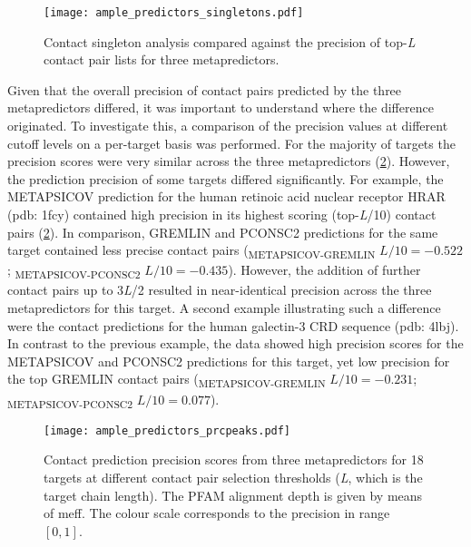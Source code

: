 \begin{figure}[H]
    \centering
    \texttt{[image: ample\_predictors\_singletons.pdf]}
    \caption[Contact singleton analysis for three metapredictors]{Contact singleton analysis compared against the precision of top-\textit{L} contact pair lists for three metapredictors.}
    \label{fig:ample_predictors_singletons}
\end{figure}

Given that the overall precision of contact pairs predicted by the three metapredictors differed, it was important to understand where the difference originated. To investigate this, a comparison of the precision values at different cutoff levels on a per-target basis was performed. For the majority of targets the precision scores were very similar across the three metapredictors (\cref{fig:ample_predictors_prcpeaks}). However, the prediction precision of some targets differed significantly. For example, the METAPSICOV prediction for the human retinoic acid nuclear receptor HRAR (\gls{pdb}: 1fcy) contained high precision in its highest scoring (top-\textit{L}/10) contact pairs (\cref{fig:ample_predictors_prcpeaks}). In comparison, GREMLIN and PCONSC2 predictions for the same target contained less precise contact pairs (\textDelta \textsubscript{METAPSICOV-GREMLIN} $L/10=-0.522$; \textDelta \textsubscript{METAPSICOV-PCONSC2} $L/10=-0.435$). However, the addition of further contact pairs up to 3\textit{L}/2 resulted in near-identical precision across the three metapredictors for this target. A second example illustrating such a difference were the contact predictions for the human galectin-3 CRD sequence (\gls{pdb}: 4lbj). In contrast to the previous example, the data showed high precision scores for the METAPSICOV and PCONSC2 predictions for this target, yet low precision for the top GREMLIN contact pairs (\textDelta \textsubscript{METAPSICOV-GREMLIN} $L/10=-0.231$; \textDelta \textsubscript{METAPSICOV-PCONSC2} $L/10=0.077$). 

\begin{figure}[H]
    \centering
    \texttt{[image: ample\_predictors\_prcpeaks.pdf]}
    \caption[Comparison of contact precision for three metapredictors]{Contact prediction precision scores from three metapredictors for 18 targets at different contact pair selection thresholds (\textit{L}, which is the target chain length). The PFAM alignment depth is given by means of \gls{meff}. The colour scale corresponds to the precision in range $[0, 1]$.}
    \label{fig:ample_predictors_prcpeaks}
\end{figure}


